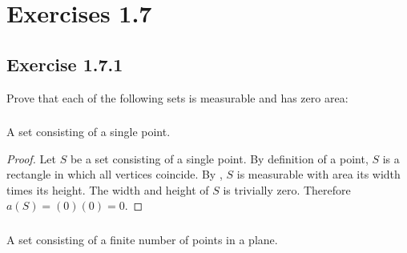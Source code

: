 \documentclass{report}
\begin{document}
\chapter{Exercises 1.7}%
\label{chap:exercises-1.7}

\section{Exercise 1.7.1}%
\label{sec:exercise-1.7.1}

Prove that each of the following sets is measurable and has zero area:

\subsection{}%
\label{sub:exercise-1.7.1a}

A set consisting of a single point.

\begin{proof}

  Let $S$ be a set consisting of a single point.
  By definition of a point, $S$ is a rectangle in which all vertices coincide.
  By , $S$ is measurable with area its width
    times its height.
  The width and height of $S$ is trivially zero.
  Therefore $a(S) = (0)(0) = 0$.

\end{proof}

\subsection{}%
\label{sub:exercise-1.7.1b}

A set consisting of a finite number of points in a plane.
\end{document}
